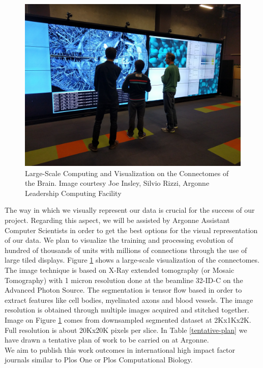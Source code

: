 \documentclass[11pt,a4paper]{article}
\begin{document}
\begin{figure}[h!]
  \includegraphics[width=\linewidth]{visualization.jpg}
  \caption{Large-Scale Computing and Visualization on the Connectomes of the Brain. %
  Image courtesy Joe Insley, Silvio Rizzi, Argonne Leadership Computing Facility}
  \label{connectome}
\end{figure}

The way in which we visually represent our data is crucial for the success of
our project.
Regarding this aspect, we will be assisted by Argonne Assistant Computer Scientists
in order to get the best options for the visual representation of our data.
We plan to visualize the training and processing evolution of hundred of thousands
of units with millions of connections through the use of large tiled displays.
Figure \ref{connectome} shows a large-scale visualization of the connectomes.
The image technique is based on X-Ray extended tomography (or Mosaic Tomography)
with 1 micron resolution done at the beamline 32-ID-C on the Advanced Photon Source.
The segmentation is tensor flow based in order to 
extract features like cell bodies, myelinated axons and blood vessels.
The image resolution is obtained through multiple images acquired
and stitched together. Image on Figure \ref{connectome} comes from
downsampled segmented dataset at 2Kx1Kx2K.
Full resolution is about 20Kx20K pixels per slice. 
In Table \ref{tentative-plan} we have drawn a tentative plan of work to be carried on
at Argonne. \\

We aim to publish this work outcomes in international high impact factor journals 
similar to Plos One or Plos Computational Biology. \\
\end{document}
